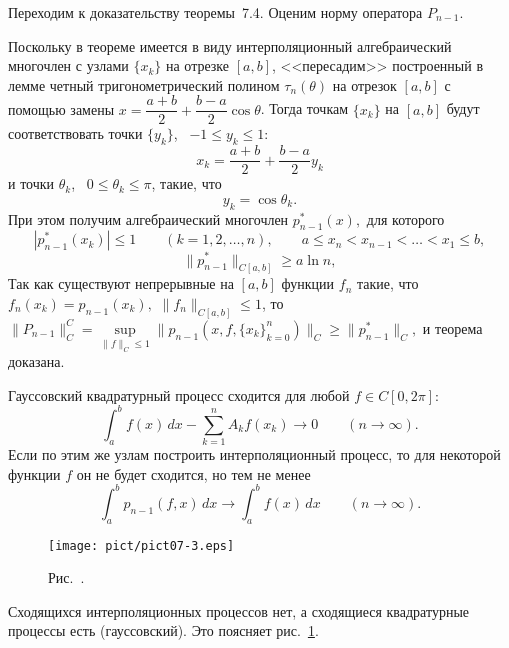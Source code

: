 Переходим к доказательству теоремы~7.4. Оценим норму оператора
$P_{n-1}.$

Поскольку в теореме имеется в виду интерполяционный алгебраический многочлен
с узлами $\{x_k\}$ на отрезке $[a,b]$, <<пересадим>> построенный в
лемме четный тригонометрический полином {$\tau_n(\theta)$} на
отрезок $[a,b]$ {с помощью замены $x=\dfrac{a+b}{2}+\dfrac{b-a}{2}\cos
\theta$}. Тогда точкам $\{x_k\}$ на $[a,b]$ будут соответствовать
точки $\{ y_k\}$,~ $-1\le y_k\le 1$:
$$
x_k=\frac{a+b}{2}+\frac{b-a}{2} y_k
$$
и точки $\theta_k$,~ $0\le \theta_k\le \pi$, {такие, что}
$$
y_k=\cos \theta_k.
$$
При этом получим алгебраический многочлен $p_{n-1}^*(x),$
для которого
$$
{|p_{n-1}^*(x_k)|\le 1 \qquad (k=1,2,\ldots,n), \qquad a\le x_n<x_{n-1}<\ldots<x_1\le b,}
$$
$$
\|p_{n-1}^*\|_{C[a,b]}\ge a\ln n,
$$
Так как существуют непрерывные на
$[a,b]$ функции $f_n$ такие, что $f_n(x_k)=p_{n-1}(x_k),$
{$\|f_n\|_{C[a,b]}\le 1$, то $\|P_{n-1}\|_C^C=\sup\limits_{\|f\|_C\le
1}\|p_{n-1}(x,f,\{x_k\}_{k=0}^n)\|_C\ge \|p_{n-1}^*\|_C,$} и теорема доказана.

\begin{Remark}
Гауссовский квадратурный процесс сходится для любой {$f\in C[0, 2\pi]$}:
$$
\int_a^b f(x)\, dx-\sum\limits_{k=1}^n A_kf(x_k) \to 0\qquad (n\to \infty).
$$
Если по этим же узлам построить интерполяционный процесс, то для некоторой
функции $f$ он не будет сходится, но тем не менее
$$
\int_a^b p_{n-1} (f,x)\, dx \to \int_a^b f(x)\, dx \qquad (n\to \infty).
$$



\begin{figure}[ht]
\begin{center}
\texttt{[image: pict/pict07-3.eps]}
\end{center}
 \bigskip
 \label{r7-3}

 \centerline{Рис.~\theris. }
 \bigskip
\end{figure}



Сходящихся интерполяционных процессов нет, а сходящиеся квадратурные процессы
есть (гауссовский). Это поясняет рис.~\ref{r7-3}.
\end{Remark}
